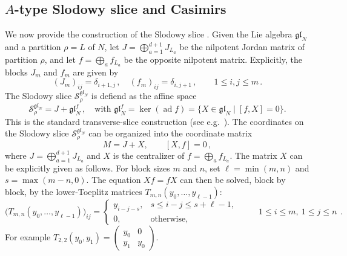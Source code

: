 \documentclass[12pt,a4paper]{article}
\begin{document}
\subsection{$A$-type Slodowy slice and Casimirs}
\label{subsec:slodowy-coordinates}
We now provide the construction of the Slodowy slice \cite{Slodowy1980}. Given the Lie algebra $\mathfrak{gl}_N$ and a partition $\rho=L$ of $N$, let $J=\bigoplus_{a=1}^{d+1}J_{L_a}$ be the nilpotent Jordan matrix of partition
$\rho$, and let $f=\bigoplus_a f_{L_a}$ be the opposite nilpotent matrix. Explicitly, the blocks $J_{m}$ and $f_{m}$ are given by
\begin{equation}
    (J_{m})_{ij}=\delta_{i+1,j}\,,\quad (f_{m})_{ij}=\delta_{i,j+1}\,, \qquad 1\leq i,j\leq m\,.
\end{equation}
The Slodowy
slice $\mathcal S^{\mathfrak{gl}_N}_\rho$ is defiend as the affine space
\begin{equation}
    \mathcal S^{\mathfrak{gl}_N}_\rho=J+\mathfrak{gl}_N^{f}\,, \quad \text{with } \mathfrak{gl}_N^{f}=\ker(\operatorname{ad}f)
 =\{X\in\mathfrak{gl}_N\mid[f,X]=0\}.
\end{equation}
This is the
standard transverse-slice construction (see e.g.\ \cite{BrundanKleshchev2004}). The coordinates on the Slodowy slice $\mathcal S^{\mathfrak{gl}_N}_\rho$ can be organized into the coordinate matrix
\begin{equation}
 M=J+X,\qquad [X,f]=0\,,
 \label{eq:slodowy-matrix}
\end{equation}
where $J=\bigoplus_{a=1}^{d+1}J_{L_a}$ and $X$ is the centralizer of $f=\bigoplus_a f_{L_a}$. The matrix $X$ can be explicitly given as follows.
For block sizes $m$ and $n$, set $\ell=\min(m,n)$ and
$s=\max(m-n,0)$.  The equation $Xf=fX$ can then be solved, block by block, by the lower-Toeplitz matrices
$T_{m,n}(y_0,\ldots,y_{\ell-1})$:
\begin{equation}
 \bigl(T_{m,n}(y_0,\ldots,y_{\ell-1})\bigr)_{ij}
 =
 \begin{cases}
 y_{i-j-s},&s\leq i-j\leq s+\ell-1,\\
 0,&\text{otherwise},
 \end{cases}
 \qquad
 \substack{1\leq i\leq m,\ 1\leq j\leq n}.
 \label{eq:lower-toeplitz-block}
\end{equation}
For example
$T_{2,2}(y_0,y_1)=\left(\begin{smallmatrix}y_0&0\\y_1&y_0\end{smallmatrix}\right)$.
\end{document}
